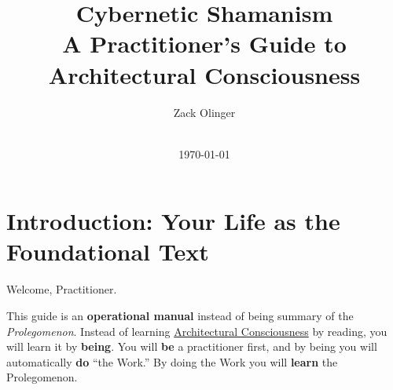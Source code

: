 \documentclass{article}
\newcommand{\docTitle}{Cybernetic Shamanism \\A Practitioner's Guide to Architectural Consciousness}
\newcommand{\docAuthor}{Zack Olinger}
\newcommand{\docVersion}{\PractitionersGuideVersion}
\begin{document}

\pagestyle{frontmatterstyle}


\begin{titlepage}
    \title{\docTitle}
    \author{\docAuthor}
    \date{
        \docVersion \\
        \vspace{1em}
        \today
    }
    \maketitle
    \thispagestyle{empty}

    \begin{abstract}
        
    \end{abstract}

\end{titlepage}


\licensepage


\fancypagestyle{plain}{
    \fancyhf{}
    \fancyfoot[L]{\docVersion}
    \fancyfoot[C]{\href{\licenseURL}{\licenseText}}
      \fancyfoot[R]{Page \thepage\ of \pageref*{LastFrontMatterPage}}
    \renewcommand{\headrulewidth}{0pt}
    \renewcommand{\footrulewidth}{0.4pt}
}


\tableofcontents
\label{LastFrontMatterPage}


\clearpage
{}
{}
\pagestyle{mainmatterstyle}


\section*{Introduction: Your Life as the Foundational Text}

Welcome, Practitioner.

This guide is an \textbf{operational manual} instead of being summary of the \textit{Prolegomenon}. Instead of learning \hyperlink{gloss:architectural_consciousness}{Architectural Consciousness} by reading, you will learn it by \textbf{being}. You will \textbf{be} a practitioner first, and by being you will automatically \textbf{do} ``the Work.'' By doing the Work you will \textbf{learn} the Prolegomenon.
\end{document}
